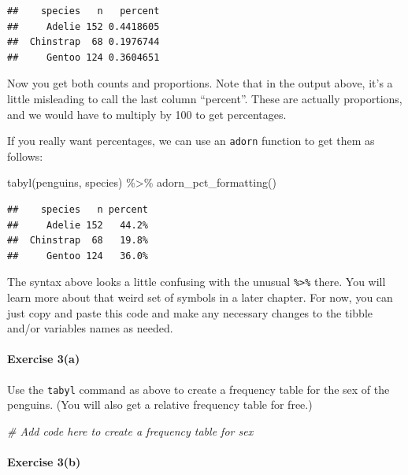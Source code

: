 \documentclass[
]{book}
\newenvironment{Shaded}{\begin{snugshade}}{\end{snugshade}}
\newcommand{\CommentTok}[1]{\textcolor[rgb]{0.56,0.35,0.01}{\textit{#1}}}
\newcommand{\FunctionTok}[1]{\textcolor[rgb]{0.00,0.00,0.00}{#1}}
\newcommand{\NormalTok}[1]{#1}
\newcommand{\SpecialCharTok}[1]{\textcolor[rgb]{0.00,0.00,0.00}{#1}}
\begin{document}
\begin{verbatim}
##    species   n   percent
##     Adelie 152 0.4418605
##  Chinstrap  68 0.1976744
##     Gentoo 124 0.3604651
\end{verbatim}

Now you get both counts and proportions. Note that in the output above, it's a little misleading to call the last column ``percent''. These are actually proportions, and we would have to multiply by 100 to get percentages.

If you really want percentages, we can use an \texttt{adorn} function to get them as follows:

\begin{Shaded}
\begin{Highlighting}[]
\FunctionTok{tabyl}\NormalTok{(penguins, species) }\SpecialCharTok{\%\textgreater{}\%}
    \FunctionTok{adorn\_pct\_formatting}\NormalTok{()}
\end{Highlighting}
\end{Shaded}

\begin{verbatim}
##    species   n percent
##     Adelie 152   44.2%
##  Chinstrap  68   19.8%
##     Gentoo 124   36.0%
\end{verbatim}

The syntax above looks a little confusing with the unusual \texttt{\%\textgreater{}\%} there. You will learn more about that weird set of symbols in a later chapter. For now, you can just copy and paste this code and make any necessary changes to the tibble and/or variables names as needed.

\hypertarget{exercise-3a}{%
\paragraph*{Exercise 3(a)}\label{exercise-3a}}

Use the \texttt{tabyl} command as above to create a frequency table for the sex of the penguins. (You will also get a relative frequency table for free.)

\begin{Shaded}
\begin{Highlighting}[]
\CommentTok{\# Add code here to create a frequency table for sex}
\end{Highlighting}
\end{Shaded}

\hypertarget{exercise-3b}{%
\paragraph*{Exercise 3(b)}\label{exercise-3b}}
\end{document}
